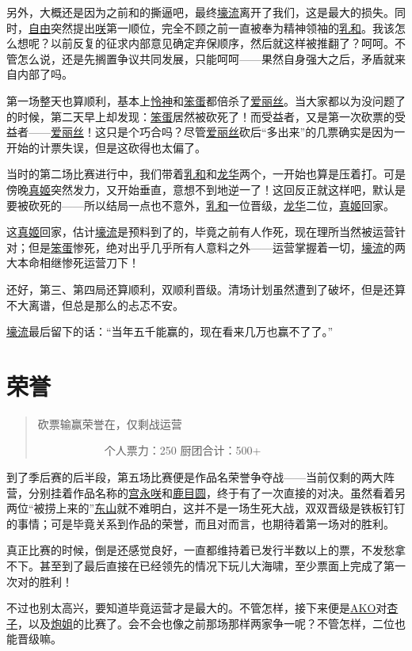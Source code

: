 另外，大概还是因为之前和的撕逼吧，最终\uline{壕流}离开了我们，这是最大的损失。同时，\uline{自由}突然提出\uline{咲}第一顺位，完全不顾之前一直被奉为精神领袖的\uline{乳和}。我该怎么想呢？以前反复的征求内部意见确定弃保顺序，然后就这样被推翻了？呵呵。不管怎么说，还是先搁置争议共同发展，只能呵呵——果然自身强大之后，矛盾就来自内部了吗。

第一场整天也算顺利，基本上\uline{怜神}和\uline{笨蛋}都倍杀了\uline{爱丽丝}。当大家都以为没问题了的时候，第二天早上却发现：\uline{笨蛋}居然被砍死了！而受益者，又是第一次砍票的受益者——\uline{爱丽丝}！这只是个巧合吗？尽管\uline{爱丽丝}砍后“多出来”的几票确实是因为一开始的计票失误，但是这砍得也太偏了。

当时的第二场比赛进行中，我们带着\uline{乳和}和\uline{龙华}两个，一开始也算是压着打。可是傍晚\uline{真姬}突然发力，又开始垂直，意想不到地逆一了！这回反正就这样吧，默认是要被砍死的——所以结局一点也不意外，\uline{乳和}一位晋级，\uline{龙华}二位，\uline{真姬}回家。

这\uline{真姬}回家，估计\uline{壕流}是预料到了的，毕竟之前有人作死，现在理所当然被运营针对；但是\uline{笨蛋}惨死，绝对出乎几乎所有人意料之外——运营掌握着一切，\uline{壕流}的两大本命相继惨死运营刀下！

还好，第三、第四局还算顺利，双顺利晋级。清场计划虽然遭到了破坏，但是还算不大离谱，但总是那么的忐忑不安。

\uline{壕流}最后留下的话：“当年五千能赢的，现在看来几万也赢不了了。”

\chapter{荣誉}
\begin{quote}
砍票输赢荣誉在，仅剩战运营

　　　　　　个人票力：250 厨团合计：500+
\end{quote}

到了季后赛的后半段，第五场比赛便是作品名荣誉争夺战——当前仅剩的两大阵营，分别挂着作品名称的\uline{宫永咲}和\uline{鹿目圆}，终于有了一次直接的对决。虽然看着另两位“被捞上来的”\uline{东山}就不难明白，这并不是一场生死大战，双双晋级是铁板钉钉的事情；可是毕竟关系到作品的荣誉，而且对而言，也期待着第一场对的胜利。

真正比赛的时候，倒是还感觉良好，一直都维持着已发行半数以上的票，不发愁拿不下。甚至到了最后直接在已经领先的情况下玩儿大海啸，至少票面上完成了第一次对的胜利！

不过也别太高兴，要知道毕竟运营才是最大的。不管怎样，接下来便是\uline{AKO}对\uline{杏子}，以及\uline{炮姐}的比赛了。会不会也像之前那场那样两家争一呢？不管怎样，二位也能晋级嘛。


